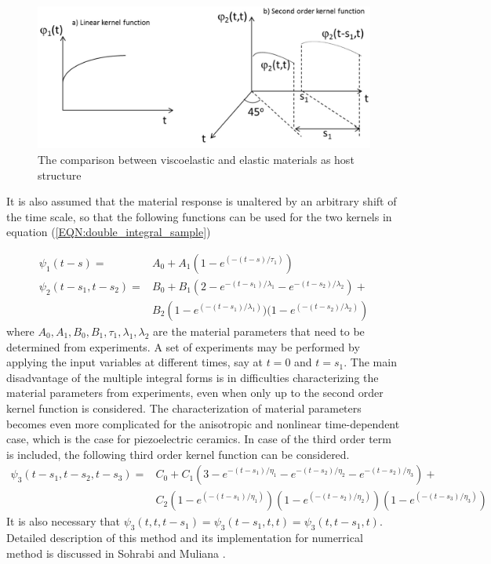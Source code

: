 \begin{figure}
\centering
\includegraphics[width=5.0in]{./chap_3_minor_loop/figures/Time_dependent_kernel_functions.png}
\caption{The comparison between viscoelastic and elastic materials as host structure}
\label{fig:2.1.Time_dependent_kernel_functions}
\end{figure}
It is also assumed that the material response is unaltered by an arbitrary shift of the time scale, so that
 the following functions can be used for the two kernels in equation (\ref{EQN:double_integral_sample})

\begin{equation}
\begin{aligned}
 \psi_1(t-s)=& A_0+A_1 (1-e^{(-(t-s)/\tau_1)}) \\ 
 \psi_2(t-s_1,t-s_2) = & B_0+B_1 
\left(2-e^{-(t-s_1)/\lambda_1}-e^{-(t-s_2)/\lambda_2}\right)+ \\
& B_2\left(1-e^{(-(t-s_1)/\lambda_1)})(1-e^{(-(t-s_2)/\lambda_2)}\right)  
\end{aligned}
\label{EQN:double_integral_sample_second}
\end{equation}
where $A_0, A_1, B_0, B_1, \tau_1, \lambda_1, \lambda_2$ are the material parameters that need to be determined from experiments.
A set of experiments may be performed by applying the input variables at different times, say at $t=0$ and $t=s_1$.
The main disadvantage of the multiple integral forms is in difficulties characterizing the material parameters from experiments,
 even when only up to the second order kernel function is considered. 
The characterization of material parameters becomes even more complicated for the anisotropic and nonlinear time-dependent case,
 which is the case for piezoelectric ceramics. 
 In case of the third order term is included, the following third order kernel function can be considered.
\begin{equation}
\begin{aligned}
 \psi_3(t-s_1,t-s_2,t-s_3) = & C_0+C_1 
\left(3-e^{-(t-s_1)/\eta_1}-e^{-(t-s_2)/\eta_2}-e^{-(t-s_2)/\eta_3}\right)+ \\
& C_2\left(1-e^{(-(t-s_1)/\eta_1)}\right)  
     \left(1-e^{(-(t-s_2)/\eta_2)}\right)
     \left(1-e^{(-(t-s_3)/\eta_3)}\right)
\end{aligned}
\label{EQN:double_integral_sample_third_order}
\end{equation}
It is also necessary that  $\psi_3(t,t,t-s_1)=\psi_3(t-s_1,t,t)= \psi_3(t,t-s_1,t)$.
Detailed description of this method and its implementation for numerrical method is discussed in Sohrabi and Muliana \cite{Sohrabi2011}.

